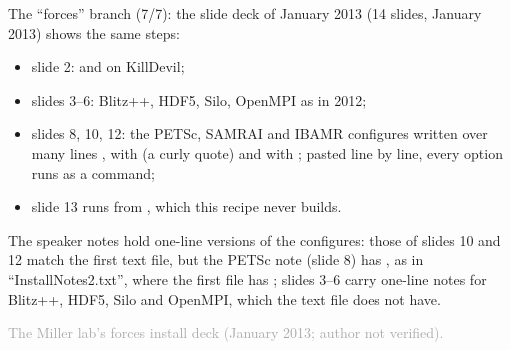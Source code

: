 \documentclass[aspectratio=169,11pt]{beamer}
\newcommand{\sourcecredit}[1]{\vfill\begin{flushright}\tiny\textcolor{DarkGray}{#1}\end{flushright}}
\newcommand{\curlyopen}{\textcolor{RubineRed}{\rmfamily\textquotedblleft}}
\begin{document}
\begin{frame}{The ``forces'' branch (7/7): the slide deck of January 2013}
\label{fr:forces4b}
\small {} (14 slides, January 2013) shows the same steps:
\begin{itemize}\setlength{\itemsep}{2pt}
  \item slide 2:  and  on KillDevil;
  \item slides 3--6: Blitz++, HDF5, Silo, OpenMPI as in 2012;
  \item slides 8, 10, 12: the PETSc, SAMRAI and IBAMR configures written over many lines , with \code{--CXXOPTFLAGS="-O3\curlyopen{}} (a curly quote) and  with ; pasted line by line, every option runs as a command;
  \item slide 13 runs  from , which this recipe never builds.
\end{itemize}
The speaker notes hold one-line versions of the configures: those of slides 10 and 12 match the first text file, but the PETSc note (slide 8) has , as in ``InstallNotes2.txt'', where the first file has ; slides 3--6 carry one-line notes for Blitz++, HDF5, Silo and OpenMPI, which the text file does not have.
\sourcecredit{The Miller lab's forces install deck (January 2013; author not verified).}
\end{frame}
\end{document}
